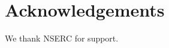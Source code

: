 \documentclass[useAMS,usenatbib]{mn2e}
\begin{document}
\section{Acknowledgements}

We thank NSERC for support.


\newcommand{\araa}{ARA\&A}   %
\newcommand{\afz}{Afz}       %
\newcommand{\aj}{AJ}         %
\newcommand{\azh}{AZh}       %
\newcommand{\aaa}{A\&A}      %
\newcommand{\aas}{A\&AS}     %
\newcommand{\aar}{A\&AR}     %
\newcommand{\apj}{ApJ}       %
\newcommand{\apjs}{ApJS}     %
\newcommand{\apjl}{ApJ}      %
\newcommand{\apss}{Ap\&SS}   %
\newcommand{\baas}{BAAS}     %
\newcommand{\jaa}{JA\&A}     %
\newcommand{\mnras}{MNRAS}   %
\newcommand{\nat}{Nat}       %
\newcommand{\pasj}{PASJ}     %
\newcommand{\pasp}{PASP}     %
\newcommand{\paspc}{PASPC}   %
\newcommand{\qjras}{QJRAS}   %
\newcommand{\sci}{Sci}       %
\newcommand{\solphys}{Solar Physics}       %
\newcommand{\sova}{SvA}      %
\newcommand{\aap}{A\&A}
\newcommand\jcap{{J. Cosmology Astropart. Phys.}}%
\newcommand{\prd}{Phys. Rev. D}






\label{lastpage}
\end{document}
